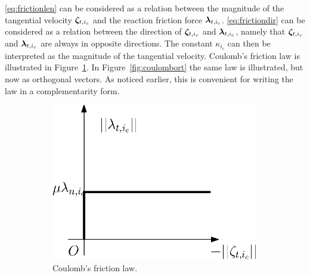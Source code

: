 \documentclass[../DC2017114Bouma.tex]{subfiles}
\begin{document}
\eqref{eq:frictionlen} can be considered as a relation between the magnitude of the tangential velocity $\boldsymbol{\zeta}_{t,i_c}$ and the reaction friction force $\boldsymbol{\lambda}_{t,i_c}$. \eqref{eq:frictiondir} can be considered as a relation between the direction of $\boldsymbol{\zeta}_{t,i_c}$ and $\boldsymbol{\lambda}_{t,i_c}$, namely that $\boldsymbol{\zeta}_{t,i_c}$ and $\boldsymbol{\lambda}_{t,i_c}$ are always in opposite directions. The constant $\kappa_{i_c}$ can then be interpreted as the magnitude of the tangential velocity. Coulomb's friction law is illustrated in Figure~\ref{fig:coulombfriction}. In Figure~\ref{fig:coulombort} the same law is illustrated, but now as orthogonal vectors. As noticed earlier, this is convenient for writing the law in a complementarity form.

\begin{figure}[h]
\centering
\begin{subfigure}{0.38\textwidth}
\centering
\includegraphics[width=\linewidth]{coulombfriction.eps}\caption{Coulomb's friction law.}\vspace{1.25cm}\label{fig:coulombfriction}
\end{subfigure}
\qquad
\begin{subfigure}{0.3\textwidth}
\centering

\end{subfigure}
\end{figure}
\end{document}
